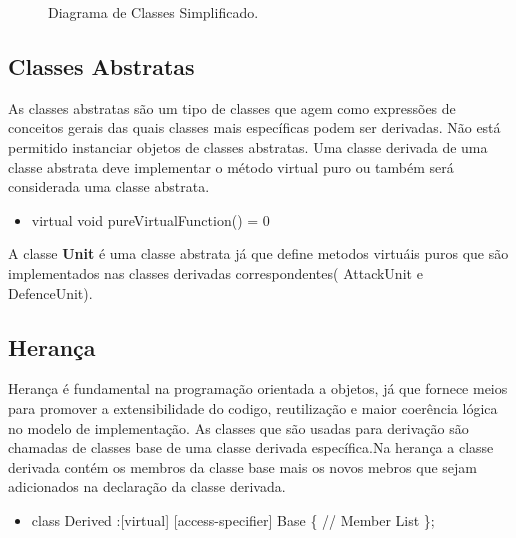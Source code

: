 \documentclass[rel_mlp]{iiufrgs}
\newcommand{\fonte}[1]{\\Fonte: {#1}}
\begin{document}
\begin{figure}[htb]
    \centering
    \label{fig:figura1}
    \caption{Diagrama de Classes Simplificado.}
\end{figure}


\subsection{Classes Abstratas}
As classes abstratas são um tipo de classes que agem como expressões de conceitos gerais das quais classes mais específicas podem ser derivadas. Não está permitido instanciar objetos de classes abstratas. 
Uma classe derivada de uma classe abstrata deve implementar o método virtual puro ou também será considerada uma classe abstrata.

 \begin{itemize}
 \item virtual void pureVirtualFunction() = 0  
 \end{itemize}  	
A classe \textbf{Unit} é uma classe abstrata já que define metodos virtuáis puros que são implementados nas classes derivadas correspondentes( AttackUnit e DefenceUnit).
\subsection{Herança}
Herança é fundamental na programação orientada a objetos, já que fornece meios para promover a extensibilidade do codigo, reutilização e maior coerência lógica no modelo de implementação. As classes que são usadas para derivação são chamadas de classes base de uma classe derivada específica.Na herança a classe derivada contém os membros da classe base mais os novos mebros que sejam adicionados na declaração da classe derivada.
 \begin{itemize}
 \item class Derived :[virtual] [access-specifier] Base
 \{ \bigbreak
 	\hspace{1cm} // Member List		
	\bigbreak
 \};  
 \end{itemize}  	
\end{document}

